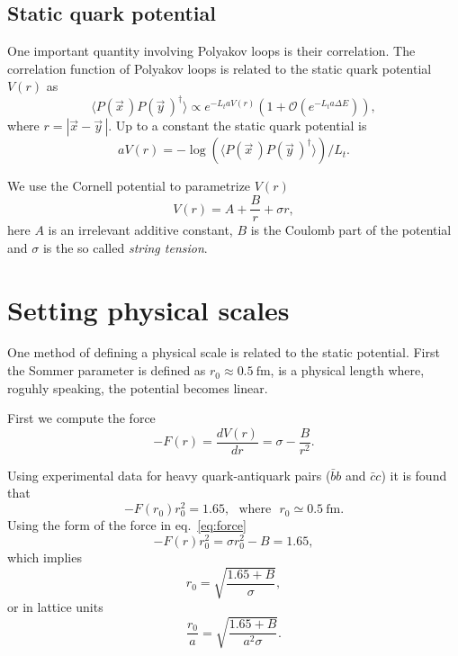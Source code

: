 \documentclass[12pt,a4paper]{article}
\begin{document}
\subsection{Static quark potential}
One important quantity involving Polyakov loops is their correlation. The correlation function of Polyakov loops is related to the static quark potential $V(r)$ as
\begin{equation}
	\langle P(\vec{x}\,) P(\vec{y}\,)^{\dagger} \rangle \propto e^{-L_t a V(r)} \left(1 +\mathcal{O}\left( e^{-L_t a \Delta E}\right) \right),
\end{equation}
where $r = |\vec{x} - \vec{y}\,|$. Up to a constant the static quark potential is
\begin{equation}
	aV(r) = - \log(\langle P(\vec{x}\,) P(\vec{y}\,)^{\dagger} \rangle)/L_t.
\end{equation}

We use the Cornell potential to parametrize $V(r)$
\begin{equation}
	V(r) = A + \frac{B}{r} + \sigma r,
\end{equation}
here $A$ is an irrelevant additive constant, $B$ is the Coulomb part of the potential and $\sigma$ is the so called \textit{string tension}.

\section{Setting physical scales}
One method of defining a physical scale is related to the static potential. First the Sommer parameter is defined as $r_0 \approx 0.5 \ \text{fm}$, is a physical length where, roguhly speaking, the potential becomes linear.

First we compute the force 
\begin{equation}
	\label{eq:force}
	-F(r) = \frac{dV(r)}{dr} = \sigma - \frac{B}{r^2}.
\end{equation}

Using experimental data for heavy quark-antiquark pairs ($\bar{b}b$ and $\bar{c}c$) it is found that 
\begin{equation}
	-F(r_0)r_0^2 = 1.65, \ \ \ \text{where} \ \ \ r_0 \simeq 0.5 \ \text{fm}.
\end{equation}
Using the form of the force in eq.\ \eqref{eq:force} 
	\begin{equation}
		-F(r)r_0^2 = \sigma r_0^2 - B = 1.65,
	\end{equation}
which implies
	\begin{equation}
		r_0 = \sqrt{\frac{1.65+B}{\sigma}},
	\end{equation}
or in lattice units
	\begin{equation}
		\frac{r_0}{a} = \sqrt{\frac{1.65+B}{a^2\sigma}}.
	\end{equation}
\end{document}
